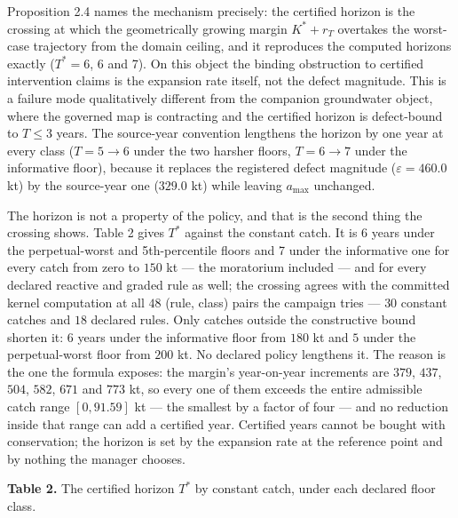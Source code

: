 \documentclass[11pt]{article}
\begin{document}
Proposition 2.4 names the mechanism precisely: the certified horizon is
the crossing at which the geometrically growing margin
\(K^* + r_T\) overtakes the worst-case trajectory from the domain
ceiling, and it reproduces the computed horizons exactly
(\(T^* = 6\), 6 and 7). On this object the binding obstruction to
certified intervention claims is the expansion rate itself, not the
defect magnitude. This is a
failure mode qualitatively different from the companion groundwater
object, where the governed map is contracting and the certified horizon
is defect-bound to \(T \le 3\) years. The source-year convention
lengthens the horizon by one year at every class (\(T = 5 \to 6\)
under the two harsher floors, \(T = 6 \to 7\) under the informative
floor), because it replaces the registered defect magnitude
(\(\varepsilon = 460.0\) kt) by the source-year one (\(329.0\) kt)
while leaving \(a_{\max}\) unchanged.

The horizon is not a property of the policy, and that is the second
thing the crossing shows. Table 2 gives \(T^*\) against the constant catch.
It is 6 years under the perpetual-worst and 5th-percentile floors and 7 under
the informative one for every catch from zero to \(150\) kt --- the
moratorium included --- and for every declared reactive and graded rule as
well; the crossing agrees with the committed kernel computation at all
\(48\) (rule, class) pairs the campaign tries --- \(30\) constant
catches and \(18\) declared rules. Only catches outside the constructive bound
shorten it: \(6\) years under the informative floor from \(180\) kt and
\(5\) under the perpetual-worst floor from \(200\) kt. No declared policy
lengthens it. The reason is the one the formula exposes: the margin's
year-on-year increments are \(379\), \(437\), \(504\), \(582\),
\(671\) and \(773\) kt, so every one of them exceeds the entire
admissible catch range \([0, 91.59]\) kt --- the smallest by a factor
of four --- and no reduction inside that range can add a certified year.
Certified years
cannot be bought with conservation; the horizon is set by the expansion rate
at the reference point and by nothing the manager chooses.

\textbf{Table 2.} The certified horizon \(T^*\) by constant catch, under
each declared floor class.
\end{document}
